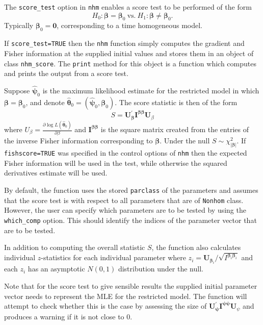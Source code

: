 \documentclass{article}
\numberwithin{equation}{section}
\begin{document}
The \verb!score_test! option in \verb!nhm! enables a score test to be performed of the form
\begin{equation}H_0 : \bm\beta  = \bm\beta_0 ~\mbox{vs.}~ H_1: \bm\beta \neq \bm\beta_0 \label{scoretest}.\end{equation} Typically $\bm\beta_0 = \mathbf{0}$, corresponding to a time homogeneous model.

If \verb!score_test=TRUE! then the \verb!nhm! function simply computes the gradient and Fisher information at the supplied initial values and stores them in an object of class \verb!nhm_score!. The \verb!print! method for this object is a function which computes and prints the output from a score test.

Suppose $\hat{\bm\psi}_0$ is the maximum likelihood estimate for the restricted model in which $\bm\beta = \bm\beta_0$, and denote $\hat{\bm\theta}_0 = (\hat{\bm\psi}_0, \bm\beta_0)$.
The score statistic is then of the form
$$S = \mathbf{U}^{'}_{\bm\beta} \mathbf{I}^{\bm\beta \bm\beta} \mathbf{U}_{\beta}$$ where
$U_\beta = \frac{\partial \log L(\hat{\bm\theta}_0)}{\partial \beta}$ and $\mathbf{I}^{\bm\beta \bm\beta}$ is the square matrix created from the entries of the inverse Fisher information corresponding to $\bm\beta$.
Under the null $S \sim \chi^2_{|\bm\beta|}$. If \verb!fishscore=TRUE! was specified in the control options of \verb!nhm! then the expected Fisher information will be used in the test, while otherwise the squared derivatives estimate will be used.

By default, the function uses the stored \verb!parclass! of the parameters and assumes that the score test is with respect to all parameters that are of \verb!Nonhom! class. However, the user can specify which parameters are to be tested by using the \verb!which_comp! option. This should identify the indices of the parameter vector that are to be tested.

In addition to computing the overall statistic $S$, the function also calculates individual $z$-statistics for each individual parameter where
$z_i = \mathbf{U}_{\bm\beta_i} / \sqrt{I^{\bm\beta_i \bm\beta_i}}$ and each $z_i$ has an asymptotic $N(0,1)$ distribution under the null.

Note that for the score test to give sensible results the supplied initial parameter vector needs to represent the MLE for the restricted model. The function will attempt to check whether this is the case by assessing the size of $\mathbf{U}^{'}_{\bm\psi} \mathbf{I}^{\bm\psi \bm\psi} \mathbf{U}_{\psi}$ and produces a warning if it is not close to 0.
\end{document}
